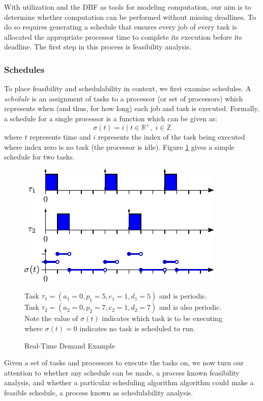 With utilization and the DBF as tools for modeling computation, our aim is to determine whether computation can be performed without missing deadlines.
To do so requires generating a schedule that ensures every job of every task is allocated the appropriate processor time to complete its execution before its deadline.
The first step in this process is feasibility analysis.

\subsubsection{Schedules}

To place feasibility and schedulability in context, we first examine schedules.
A \textit{schedule} is an assignment of tasks to a processor (or set of processors) which represents when (and thus, for how long) each job and task is executed.
Formally, a schedule for a single processor is a function which can be given as:
\begin{equation}
    \sigma(t) = i \; | \; t \in \mathbb{R}^+, \; i \in \mathbb{Z}
\end{equation}
where $t$ represents time and $i$ represents the index of the task being executed where index zero is no task (the processor is idle).
Figure \ref{fig:rt-schedule} gives a simple schedule for two tasks.

\begin{figure}[!htbp]
    \centering
    \includegraphics[width=0.5\linewidth]{fig/scheduleExample.pdf}
    \caption{Real-Time Demand Example}
    Task $\tau_1 = (a_1 = 0, p_1 = 5, c_1 = 1, d_1 = 5)$ and is periodic.\\
    Task $\tau_2 = (a_2 = 0, p_2 = 7, c_2 = 1, d_2 = 7)$ and is also periodic.\\
    Note the value of $\sigma(t)$ indicates which task is to be executing\\
    where $\sigma(t) = 0$ indicates no task is scheduled to run.
    \label{fig:rt-schedule}
\end{figure}

Given a set of tasks and processors to execute the tasks on, we now turn our attention to whether any schedule can be made, a process known feasibility analysis, and whether a particular scheduling algorithm algorithm could make a feasible schedule, a process known as schedulability analysis.

